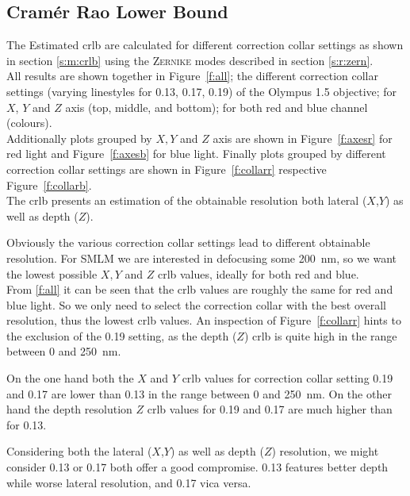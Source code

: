 \documentclass[11pt, a4paper, oneside, twocolumn]{report}
\begin{document}
\clearpage\subsection{Cram\'er Rao Lower Bound}\label{s:r:crlb}

The Estimated \acrfull{crlb} are calculated for different correction
collar settings as shown in section \ref{s:m:crlb} using the
\textsc{Zernike} modes described in section \ref{s:r:zern}.\\

All results are shown together in Figure~\ref{f:all}; the different
correction collar settings (varying linestyles for 0.13, 0.17, 0.19)
of the Olympus \SI{1.5}{\NA} objective; for $X$, $Y$ and $Z$ axis
(top, middle, and bottom); for both red and blue channel (colours).\\

Additionally plots grouped by $X, Y$ and $Z$ axis are shown in
Figure~\ref{f:axesr} for red light and Figure~\ref{f:axesb} for blue
light. Finally plots grouped by different correction collar settings
are shown in Figure~\ref{f:collarr} respective
Figure~\ref{f:collarb}.\\

The \gls{crlb} presents an estimation of the obtainable resolution
both lateral ($X$,$Y$) as well as depth ($Z$).

Obviously the various correction collar settings lead to different
obtainable resolution. For SMLM we are interested in defocusing some
\SI{200}{nm}, so we want the lowest possible $X,Y$ and $Z$ \gls{crlb}
values, ideally for both red and blue.\\

From \ref{f:all} it can be seen that the \gls{crlb} values are roughly
the same for red and blue light. So we only need to select the
correction collar with the best overall resolution, thus the lowest
\gls{crlb} values. An inspection of Figure~\ref{f:collarr} hints to
the exclusion of the 0.19 setting, as the depth ($Z$) \gls{crlb} is
quite high in the range between 0 and \SI{250}{nm}.

On the one hand both the $X$ and $Y$ \gls{crlb} values for correction
collar setting 0.19 and 0.17 are lower than 0.13 in the range between
0 and \SI{250}{nm}. On the other hand the depth resolution $Z$
\gls{crlb} values for 0.19 and 0.17 are much higher than for 0.13.

Considering both the lateral ($X$,$Y$) as well as depth ($Z$)
resolution, we might consider 0.13 or 0.17 both offer a good
compromise. 0.13 features better depth while worse lateral resolution,
and 0.17 vica versa.
\end{document}
